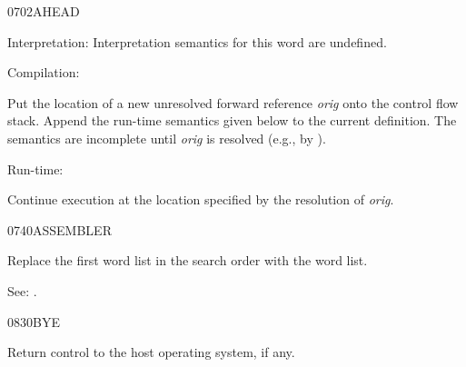 \begin{newword*}{0702}{AHEAD}
\item[Interpretation:]
	Interpretation semantics for this word are undefined.

\item[Compilation:]

	Put the location of a new unresolved forward reference
	\emph{orig} onto the control flow stack. Append the run-time
	semantics given below to the current definition. The semantics
	are incomplete until \emph{orig} is resolved (e.g., by
	).

\item[Run-time:]
	\stack{}{}

	Continue execution at the location specified by the resolution
	of \emph{orig}.
\end{newword*}


\begin{newword}{0740}{ASSEMBLER}
	\stack{}{}

	Replace the first word list in the search order with the
	 word list.

\item[See:]
	.
\end{newword}


\begin{newword}{0830}{BYE}
	\stack{}{}

	Return control to the host operating system, if any.
\end{newword}


